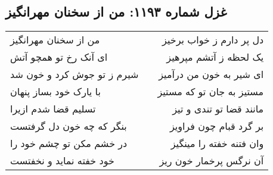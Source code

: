 \begin{center}
\section*{غزل شماره ۱۱۹۳: من از سخنان مهرانگیز}
\label{sec:1193}
\begin{longtable}{l p{0.5cm} r}
من از سخنان مهرانگیز
&&
دل پر دارم ز خواب برخیز
\\
ای آنک رخ تو همچو آتش
&&
یک لحظه ز آتشم مپرهیز
\\
شیرم ز تو جوش کرد و خون شد
&&
ای شیر به خون من درآمیز
\\
با یارک خود بساز پنهان
&&
مستیز به جان تو که مستیز
\\
تسلیم قضا شدم ازیرا
&&
مانند قضا تو تندی و تیز
\\
بنگر که چه خون دل گرفتست
&&
بر گرد قبام چون فراویز
\\
در خشم مکن تو چشم خود را
&&
وان فتنه خفته را مینگیز
\\
خود خفته نماید و نخفتست
&&
آن نرگس پرخمار خون ریز
\\
\end{longtable}
\end{center}
